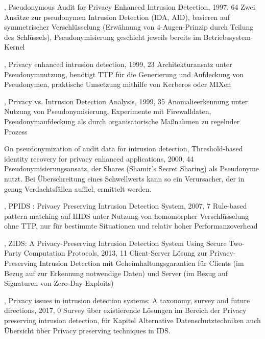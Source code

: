 \cite{sobirey1997pseudonymous}, Pseudonymous Audit for Privacy Enhanced Intrusion Detection, 1997, 64
Zwei Ansätze zur pseudonymen Intrusion Detection (IDA, AID), basieren auf symmetrischer Verschlüsselung (Erwähnung von 4-Augen-Prinzip durch Teilung des Schlüssels), Pseudonymisierung geschieht jeweils bereits im Betriebssystem-Kernel

\cite{buschkes1999privacy}, Privacy enhanced intrusion detection, 1999, 23
Architekturansatz unter Pseudonymnutzung, benötigt TTP für die Generierung und Aufdeckung von Pseudonymen, praktische Umsetzung mithilfe von Kerberos oder MIXen

\cite{lundin1999privacy, lundin2000anomaly}, Privacy vs. Intrusion Detection Analysis, 1999, 35
Anomalieerkennung unter Nutzung von Pseudonymisierung, Experimente mit Firewalldaten, Pseudonymaufdeckung als durch organisatorische Maßnahmen zu regelnder Prozess

\cite{biskup2000threshold, biskup2001pseudonymization} On pseudonymization of audit data for intrusion detection, Threshold-based identity recovery for privacy enhanced applications, 2000, 44
Pseudonymisierungsansatz, der Shares (Shamir's Secret Sharing) als Pseudonyme nutzt. Bei Überschreitung eines Schwellwerts kann so ein Verursacher, der in genug Verdachtsfällen auffiel, ermittelt werden.



\cite{park2007ppids}, PPIDS : Privacy Preserving Intrusion Detection System, 2007, 7
Rule-based pattern matching auf HIDS unter Nutzung von homomorpher Verschlüsselung ohne TTP, nur für bestimmte Situationen und relativ hoher Performanzoverhead

\cite{niksefat2013zids}, ZIDS: A Privacy-Preserving Intrusion Detection System Using Secure Two-Party Computation Protocols, 2013, 11
Client-Server Lösung zur Privacy-Preserving Intrusion Detection mit Geheimhaltungsgarantien für Clients (im Bezug auf zur Erkennung notwendige Daten) und Server (im Bezug auf Signaturen von Zero-Day-Exploits)



\cite{niksefat2017privacy}, Privacy issues in intrusion detection systems: A taxonomy, survey and future directions, 2017, 0
Survey über existierende Lösungen im Bereich der Privacy preserving intrusion detection, für Kapitel Alternative Datenschutztechniken auch Übersicht über Privacy preserving techniques in IDS.